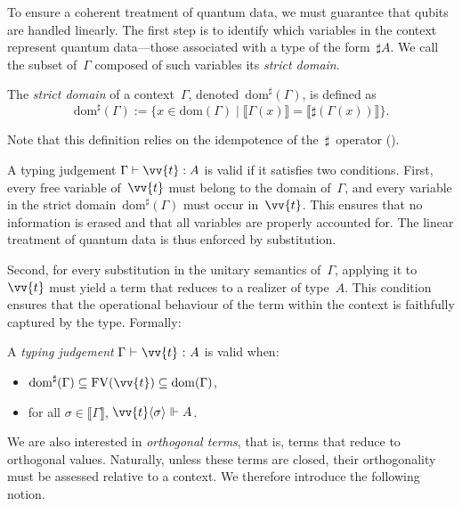 \documentclass[runningheads,orivec,envcountsame,envcountsect]{llncs}
\newcommand\ansubst[2]{\ensuremath{\langle #1 \rangle_{#2}}}
\newcommand\dom[1]{\mathrm{dom}(#1)}
\newcommand\sdom[1]{\mathrm{dom}^{\sharp}(#1)}
\newcommand\FV[1]{\mathrm{FV}(#1)}
\def\sem#1{\llbracket#1\rrbracket}
\def\TYP#1#2#3{#1~{\vdash}~#2~{:}~#3}
\def\real{\Vdash}
\begin{document}
To ensure a coherent treatment of quantum data, we must guarantee that qubits
are handled linearly. The first step is to identify which variables in the
context represent quantum data---those associated with a type of the
form~$\sharp A$. We call the subset of~$\Gamma$ composed of such variables its
\emph{strict domain}.

\begin{definition}
  The \emph{strict domain} of a context~$\Gamma$, denoted~$\sdom{\Gamma}$, is
  defined as
  \[
    \sdom{\Gamma} :=
    \{x \in \dom{\Gamma} \mid
      \sem{\Gamma(x)} = \sem{\sharp(\Gamma(x))}\}.
  \]
\end{definition}

Note that this definition relies on the idempotence of the~$\sharp$~operator
().


A typing judgement $\Gamma\vdash \vv{t}:A$ is valid if it satisfies two
conditions.  First, every free variable of~$\vv{t}$ must belong to the domain
of~$\Gamma$, and every variable in the strict domain~$\sdom{\Gamma}$ must occur
in~$\vv{t}$.  This ensures that no information is erased and that all variables
are properly accounted for.  The linear treatment of quantum data is thus
enforced by substitution.

Second, for every substitution in the unitary semantics of~$\Gamma$, applying
it to~$\vv{t}$ must yield a term that reduces to a realizer of type~$A$.  This
condition ensures that the operational behaviour of the term within the context
is faithfully captured by the type.  Formally:

\begin{definition}
  A \emph{typing judgement} $\TYP{\Gamma}{\vv{t}}{A}$ is valid when:
  \begin{itemize}
    \item $\sdom{\Gamma}\subseteq\FV{\vv{t}}\subseteq\dom{\Gamma}$,
    \item for all $\sigma\in\sem{\Gamma}$, 
          $\vv{t}\ansubst{\sigma}{}\real A$.
  \end{itemize}
\end{definition}


We are also interested in \emph{orthogonal terms}, that is, terms that reduce
to orthogonal values.  
Naturally, unless these terms are closed, their orthogonality must be assessed
relative to a context.  
We therefore introduce the following notion.
\end{document}
